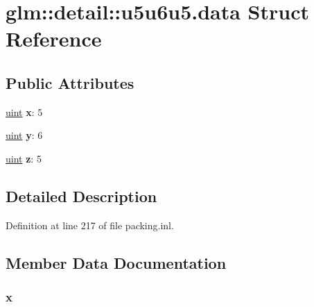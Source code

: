 \hypertarget{structglm_1_1detail_1_1u5u6u5_8data}{}\section{glm\+:\+:detail\+:\+:u5u6u5.\+data Struct Reference}
\label{structglm_1_1detail_1_1u5u6u5_8data}
\subsection*{Public Attributes}
\begin{DoxyCompactItemize}
\item 
\mbox{\label{structglm_1_1detail_1_1u5u6u5_8data_a9dd4e461268c8034f5c8564e155c67a6}} 
\hyperlink{group__core__precision_ga4fd29415871152bfb5abd588334147c8}{uint} {\bfseries x}\+: 5
\item 
\mbox{\label{structglm_1_1detail_1_1u5u6u5_8data_a415290769594460e2e485922904f345d}} 
\hyperlink{group__core__precision_ga4fd29415871152bfb5abd588334147c8}{uint} {\bfseries y}\+: 6
\item 
\mbox{\label{structglm_1_1detail_1_1u5u6u5_8data_afbade9e36a3f36d3d676c1b808451dd7}} 
\hyperlink{group__core__precision_ga4fd29415871152bfb5abd588334147c8}{uint} {\bfseries z}\+: 5
\end{DoxyCompactItemize}


\subsection{Detailed Description}


Definition at line 217 of file packing.\+inl.



\subsection{Member Data Documentation}
\mbox{\label{structglm_1_1detail_1_1u5u6u5_8data_a9dd4e461268c8034f5c8564e155c67a6}} 
\subsubsection{\texorpdfstring{x}{x}}
{\footnotesize\ttfamily }

